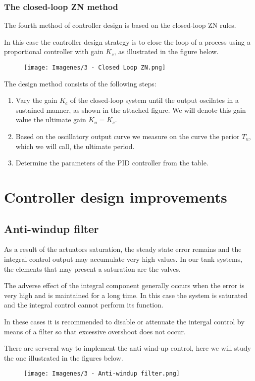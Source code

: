 \subsubsection{The closed-loop ZN method}
The fourth method of controller design is based on the closed-loop ZN rules.

In this case the controller design strategy is to close the loop of a process using a proportional controller with gain $K_c$, as illustrated in the figure below.

\begin{figure}[H]
    \centering
    \texttt{[image: Imagenes/3 - Closed Loop ZN.png]}
\end{figure}

The design method consists of the following steps:
\begin{enumerate}
    \item Vary the gain $K_c$ of the closed-loop system until the output oscilates in a sustained manner, as shown in the attached figure. We will denote this gain value the ultimate gain $K_u = K_c$.
    \item Based on the oscillatory output curve we measure on the curve the perior $T_u$, which we will call, the ultimate period.
    \item Determine the parameters of the PID controller from the table.
\end{enumerate}

\section{Controller design improvements}
\subsection{Anti-windup filter}
As a result of the actuators saturation, the steady state error remains and the integral control output may accumulate very high values. In our tank systems, the elements that may present a saturation are the valves.

The adverse effect of the integral component generally occurs when the error is very high and is maintained for a long time. In this case the system is saturated and the integral control cannot perform its function.

In these cases it is recommended to disable or attenuate the intergal control by means of a filter so that excessive overshoot does not occur.

There are serveral way to implement the anti wind-up control, here we will study the one illustrated in the figures below.

\begin{figure}[H]
    \centering
    \texttt{[image: Imagenes/3 - Anti-windup filter.png]}
\end{figure}